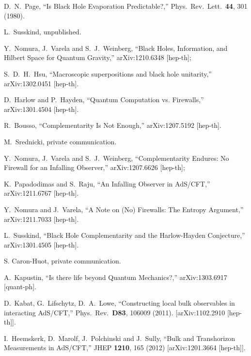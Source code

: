 \documentclass[12pt]{article}
\begin{document}
\begin{thebibliography}{99}
  D.~N.~Page,
  ``Is Black Hole Evaporation Predictable?,''
  Phys.\ Rev.\ Lett.\  {\bf 44}, 301 (1980).

L.~Susskind, unpublished.

  Y.~Nomura, J.~Varela and S.~J.~Weinberg,
  ``Black Holes, Information, and Hilbert Space for Quantum Gravity,''
  arXiv:1210.6348 [hep-th];

  S.~D.~H.~Hsu,
  ``Macroscopic superpositions and black hole unitarity,''
  arXiv:1302.0451 [hep-th].

  D.~Harlow and P.~Hayden,
  ``Quantum Computation vs. Firewalls,''
  arXiv:1301.4504 [hep-th].

  R.~Bousso,
  ``Complementarity Is Not Enough,''
  arXiv:1207.5192 [hep-th].

M.~Srednicki, private communication.

  Y.~Nomura, J.~Varela and S.~J.~Weinberg,
  ``Complementarity Endures: No Firewall for an Infalling Observer,''
  arXiv:1207.6626 [hep-th];


  K.~Papadodimas and S.~Raju,
  ``An Infalling Observer in AdS/CFT,''
  arXiv:1211.6767 [hep-th].

  Y.~Nomura and J.~Varela,
  ``A Note on (No) Firewalls: The Entropy Argument,''
  arXiv:1211.7033 [hep-th].

  L.~Susskind,
  ``Black Hole Complementarity and the Harlow-Hayden Conjecture,''
  arXiv:1301.4505 [hep-th].

 S. Caron-Huot, private communication.

  A.~Kapustin,
  ``Is there life beyond Quantum Mechanics?,''
  arXiv:1303.6917 [quant-ph].

  D.~Kabat, G.~Lifschytz, D.~A.~Lowe,
  ``Constructing local bulk observables in interacting AdS/CFT,''
  Phys.\ Rev.\  {\bf D83}, 106009 (2011).
  [arXiv:1102.2910 [hep-th]].

  I.~Heemskerk, D.~Marolf, J.~Polchinski and J.~Sully,
  ``Bulk and Transhorizon Measurements in AdS/CFT,''
  JHEP {\bf 1210}, 165 (2012)
  [arXiv:1201.3664 [hep-th]].


\end{thebibliography}
\end{document}
